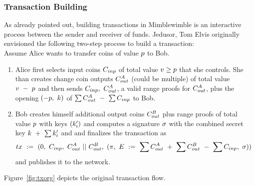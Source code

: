 \subsubsection{Transaction Building}
As already pointed out, building transactions in Mimblewimble is an interactive process between the sender and receiver of funds. Jedusor, Tom Elvis originally envisioned the following two-step process
to build a transaction:~\cite{jedusor2016mimblewimble}\\
Assume Alice wants to transfer coins of value $p$ to Bob.
\begin{enumerate}
    \item Alice first selects input coins $C_{inp}$ of total value $v \geq p$ that she controls. She than creates change coin outputs $C_{out}^{A}$ (could be multiple) of total value $v ~-~ p$ and then
    sends $C_{inp} ,~ C_{out}^{A}$, a valid range proofs for $C_{out}^{A}$, plus the opening $(-p ,~ k)$ of $\sum{C_{out}^{A}} ~-~ \sum{C_{inp}}$ to Bob.
    \item Bob creates himself additional output coins $C_{out}^B$ plus range proofs of total value $p$ with keys $(k'_i)$ and computes a signature $\sigma$ with the combined secret key $k ~+~ \sum{k'_i}$ and
    and finalizes the transaction as
    \[ tx ~:=~ (0 ,~ C_{inp} ,~ C_{out}^A ~||~ C_{out}^B ,~ (\pi ,~ E ~:=~ \sum{C_{out}^A} ~+~ \sum{C_{out}^B} ~-~ \sum{C_{inp}} ,~ \sigma)) \]
    and publishes it to the network.
\end{enumerate}
Figure~\ref{fig:txorg} depicts the original transaction flow.\\
